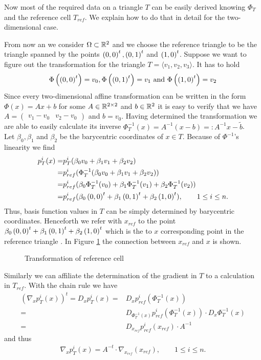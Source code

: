 Now most of the required data on a triangle $T$ can be easily derived knowing $\Phi_T$ and the reference cell $T_{ref}$. We explain how to do that in detail for the two-dimensional case.

\begin{example}\label{ex: base cell trafo}
From now an we consider $\Omega \subset \mathbb{R}^2$ and we choose the reference triangle to be the triangle spanned by the points $\left( 0, 0\right)^t, \left( 0, 1\right)^t$ and $\left( 1, 0\right)^t$.
Suppose we want to figure out the transformation for the triangle $T = \langle v_1,v_2,v_3 \rangle$.
It has to hold
\[
\Phi\left(\left( 0, 0\right)^t\right) = v_0, \Phi\left(\left( 0, 1\right)^t\right) = v_1 \textnormal{ and } \Phi\left(\left( 1, 0\right)^t\right) = v_2
\]
Since every two-dimensional affine transformation can be written in the form $\Phi(x) = Ax+b$ for some $A \in \mathbb{R}^{2 \times 2}$ and $b \in \mathbb{R}^2$ it is easy to verify that we have $A = \begin{pmatrix} v_1-v_0 & v_2-v_0\end{pmatrix}$ and $b = v_0$.
Having determined the transformation we are able to easily calculate its inverse $\Phi_T^{-1}(x) = A^{-1} (x-b) =: A^{-1} x- \tilde b$. \\
Let $\beta_0, \beta_1$ and $\beta_2$ be the barycentric coordinates of $x \in T$. Because of $\Phi^{-1}$'s linearity we find
\begin{align*}
	p^i_T(x) =& p_T^i( \beta_0 v_0 +\beta_1 v_1 + \beta_2 v_2  ) \\
	=& p^i_{ref}(\Phi_T^{-1}(\beta_0 v_0 +\beta_1 v_1 + \beta_2 v_2)) \\
	=& p^i_{ref}(\beta_0 \Phi_T^{-1}(v_0) +\beta_1 \Phi_T^{-1}(v_1) + \beta_2 \Phi_T^{-1}(v_2)) \\
		=& p^i_{ref}(\beta_0 \left( 0, 0\right)^t +\beta_1 \left( 0, 1\right)^t + \beta_2 \left( 1, 0\right)^t ), \qquad 1 \leq i \leq n.
\end{align*}
Thus, basis function values in $T$ can be simply determined by barycentric coordinates. Henceforth we refer with $x_{ref}$  to the point $\beta_0 \left( 0, 0\right)^t +\beta_1 \left( 0, 1\right)^t + \beta_2 \left( 1, 0\right)^t$ which is the to $x$ corresponding point in the reference triangle . In Figure \ref{fig: transformation} the connection between $x_{ref}$ and $x$ is shown.

\begin{figure}[!h]
	
	\caption{Transformation of reference cell}
	 \label{fig: transformation}
\end{figure}

Similarly we can affiliate the determination of the gradient in $T$ to a calculation in $T_{ref}$. With the chain rule we have
\begin{align*}
	\left(\nabla_x p_T^i(x)\right)^t = D_x p_T^i(x) =& D_x p^i_{ref}(\Phi_T^{-1}(x)) \\
	  =& D_{\Phi_T^{-1}(x)}p^i_{ref}(\Phi_T^{-1}(x)) \cdot D_x  \Phi_T^{-1}(x) \\
	  =& D_{x_{ref}}p^i_{ref}(x_{ref}) \cdot  A^{-1}
\end{align*}
and thus
\begin{align}
	\nabla_x p_T^i(x) = A^{-t} \cdot \nabla_{x_{ref}}(x_{ref}), \qquad 1 \leq i \leq n. \label{eq: ref gradient}
\end{align}


\end{example}
